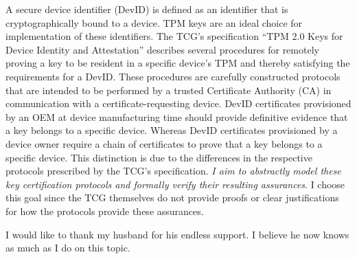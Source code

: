 \begin{abstractlong}

A secure device identifier (DevID) is defined as an identifier that is cryptographically bound to a device. TPM keys are an ideal choice for implementation of these identifiers.
The TCG's specification ``TPM 2.0 Keys for Device Identity and Attestation'' describes several procedures for remotely proving a key to be resident in a specific device's TPM and thereby satisfying the requirements for a DevID. These procedures are carefully constructed protocols that are intended to be performed by a trusted Certificate Authority (CA) in communication with a certificate-requesting device. DevID certificates provisioned by an OEM at device manufacturing time should provide definitive evidence that a key belongs to a specific device. Whereas DevID certificates provisioned by a device owner
require a chain of certificates to prove that a key belongs to a specific device. This distinction is due to the differences in the respective protocols prescribed by the TCG's specification. \textit{I aim to abstractly model these key certification protocols and formally verify their resulting assurances}. I choose this goal since the TCG themselves do not provide proofs or clear justifications for how the protocols provide these assurances. 

\end{abstractlong}





\begin{acknowledgementslong}

I would like to thank my husband for his endless support. I believe he now knows as much as I do on this topic.

\end{acknowledgementslong}

